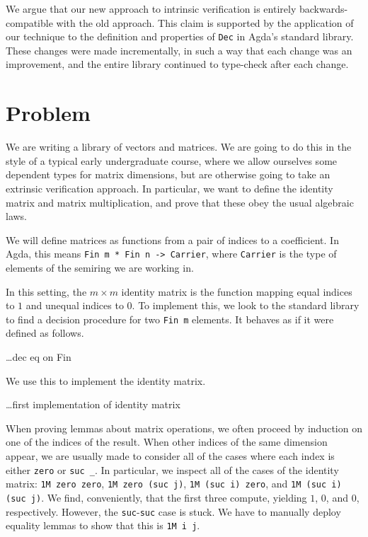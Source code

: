 \documentclass[submission,copyright,creativecommons]{eptcs}
\begin{document}
We argue that our new approach to intrinsic verification is entirely
backwards-compatible with the old approach.
This claim is supported by the application of our technique to the definition
and properties of \texttt{Dec} in Agda's standard library.
These changes were made incrementally, in such a way that each change was an
improvement, and the entire library continued to type-check after each change.

\section{Problem}

We are writing a library of vectors and matrices.
We are going to do this in the style of a typical early undergraduate course,
where we allow ourselves some dependent types for matrix dimensions, but are
otherwise going to take an extrinsic verification approach.
In particular, we want to define the identity matrix and matrix multiplication,
and prove that these obey the usual algebraic laws.

We will define matrices as functions from a pair of indices to a coefficient.
In Agda, this means \texttt{Fin m * Fin n -> Carrier}, where \texttt{Carrier} is
the type of elements of the semiring we are working in.

In this setting, the $m \times m$ identity matrix is the function mapping equal
indices to $1$ and unequal indices to $0$.
To implement this, we look to the standard library to find a decision procedure
for two \texttt{Fin m} elements.
It behaves as if it were defined as follows.

\dots dec eq on Fin

We use this to implement the identity matrix.

\dots first implementation of identity matrix

When proving lemmas about matrix operations, we often proceed by induction on
one of the indices of the result.
When other indices of the same dimension appear, we are usually made to consider
all of the cases where each index is either \texttt{zero} or \texttt{suc _}.
In particular, we inspect all of the cases of the identity matrix:
\texttt{1M zero zero}, \texttt{1M zero (suc j)}, \texttt{1M (suc i) zero}, and
\texttt{1M (suc i) (suc j)}.
We find, conveniently, that the first three compute, yielding $1$, $0$, and $0$, respectively.
However, the \texttt{suc}-\texttt{suc} case is stuck.
We have to manually deploy equality lemmas to show that this is
\texttt{1M i j}.
\end{document}

